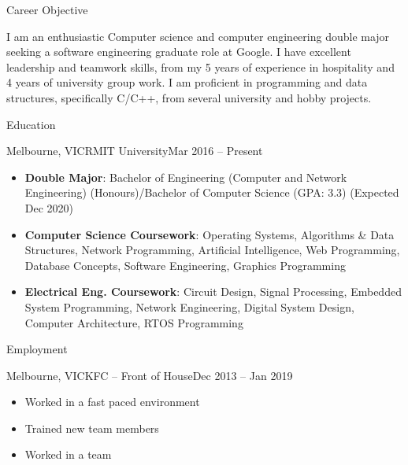 \documentclass[]{mcdowellcv}
\begin{document}
	\makeheader
	
	\begin{cvsection}{Career Objective}
		\begin{cvsubsection}{}{}{}
			I am an enthusiastic Computer science and computer engineering double major seeking a software engineering graduate role at Google.
			I have excellent leadership and teamwork skills, from my 5 years of experience in hospitality and 4 years of university group work.
			I am proficient in programming and data structures, specifically C/C++, from several university and hobby projects.
		\end{cvsubsection}
	\end{cvsection}

	\begin{cvsection}{Education}
		\begin{cvsubsection}{Melbourne, VIC}{RMIT University}{Mar 2016 -- Present}
			\begin{itemize}
				\item \textbf{Double Major}: Bachelor of Engineering (Computer and Network Engineering) (Honours)/Bachelor of Computer Science (GPA: 3.3) (Expected Dec 2020) 
				\item \textbf{Computer Science Coursework}: Operating Systems, Algorithms \& Data Structures, Network Programming, Artificial Intelligence, Web Programming, Database Concepts, Software Engineering, Graphics Programming
				\item \textbf{Electrical Eng. Coursework}: Circuit Design, Signal Processing, Embedded System Programming, Network Engineering, Digital System Design, Computer Architecture, RTOS Programming
			\end{itemize}
		\end{cvsubsection}
	\end{cvsection}

	\begin{cvsection}{Employment}
		\begin{cvsubsection}{Melbourne, VIC}{KFC -- Front of House}{Dec 2013 -- Jan 2019}
			\begin{itemize}
				\item Worked in a fast paced environment 
				\item Trained new team members 
				\item Worked in a team 
			\end{itemize}
		\end{cvsubsection}
	\end{cvsection}
\end{document}
